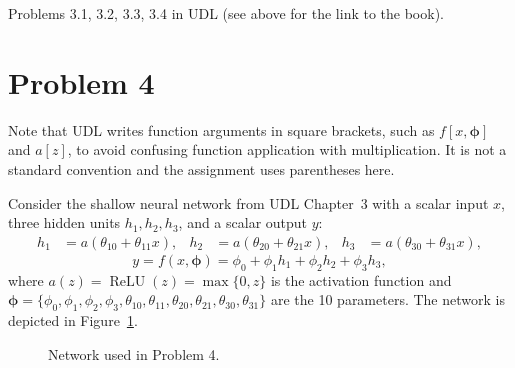 \documentclass[letterpaper]{article}
\begin{document}
Problems 3.1, 3.2, 3.3, 3.4 in UDL (see above for the link to the book).

\section*{Problem 4}

Note that UDL writes function arguments in square brackets, such as $f[x, \bm{\phi}]$ and $a[z]$, to avoid confusing function application with multiplication. It is not a standard convention and the assignment uses parentheses here. 


Consider the shallow neural network from UDL Chapter~3 with a scalar input $x$, three hidden units $h_1, h_2, h_3$, and a scalar output $y$:
\begin{align*}
  h_1 &= a(\theta_{10} + \theta_{11} x), &
  h_2 &= a(\theta_{20} + \theta_{21} x), &
  h_3 &= a(\theta_{30} + \theta_{31} x),
\end{align*}
\[
  y = f(x, \bm{\phi}) = \phi_0 + \phi_1 h_1 + \phi_2 h_2 + \phi_3 h_3,
\]
where $a(z) = \operatorname{ReLU}(z) = \max\{0, z\}$ is the activation function and $\bm{\phi} = \{\phi_0, \phi_1, \phi_2, \phi_3, \theta_{10}, \theta_{11}, \theta_{20}, \theta_{21}, \theta_{30}, \theta_{31}\}$ are the 10 parameters. The network is depicted in Figure~\ref{fig:netwowrk}.

\begin{figure}
\begin{center}
\end{center}
  \caption{Network used in Problem 4. }
  \label{fig:netwowrk}
\end{figure}
\end{document}
